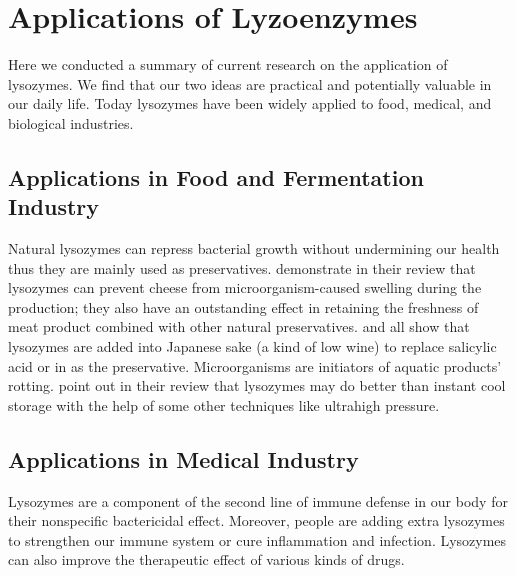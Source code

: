 \section{Applications of Lyzoenzymes}
Here we conducted a summary of current research on the application of lysozymes. We find that our two ideas are practical and potentially valuable in our daily life. Today lysozymes have been widely applied to food, medical, and biological industries. 

\subsection{Applications in Food and Fermentation Industry}

Natural lysozymes can repress bacterial growth without undermining our health thus they are mainly used as preservatives. \citet{ZHAI2015} demonstrate in their review that lysozymes can prevent cheese from microorganism-caused swelling during the production; they also have an outstanding effect in retaining the freshness of meat product combined with other natural preservatives.
\citet{Yu-tong2006} and \citet{ZHAI2015} all show that lysozymes are added into Japanese sake (a kind of low wine) to replace salicylic acid or  in as the preservative. Microorganisms are initiators of aquatic products' rotting. \citet{Ren2013} point out in their review that lysozymes may do better than instant cool storage with the help of some other techniques like ultrahigh pressure.


\subsection{Applications in Medical Industry}
Lysozymes are a component of the second line of immune defense in our body for their nonspecific bactericidal effect. Moreover, people are adding extra lysozymes to strengthen our immune system or cure inflammation and infection. Lysozymes can also improve the therapeutic effect of various kinds of drugs. 

